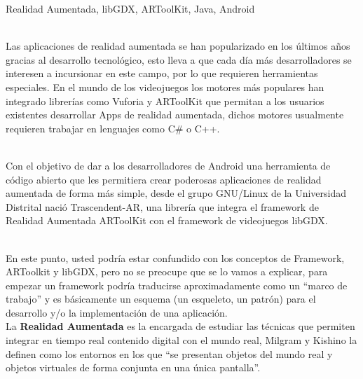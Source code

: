 \begin{multicols}{2}



 Realidad Aumentada, libGDX, ARToolKit, Java, Android



\\
Las aplicaciones de realidad aumentada se han popularizado en los últimos años gracias al desarrollo tecnológico, esto lleva a que cada día más desarrolladores se interesen a incursionar en este campo, por lo que requieren herramientas especiales. En el mundo de los videojuegos los motores más populares han integrado librerías como Vuforia y ARToolKit que permitan a los usuarios existentes desarrollar Apps de realidad aumentada, dichos motores usualmente requieren trabajar en lenguajes como C\# o C++. 

\\
Con el objetivo de dar a los desarrolladores de Android una herramienta de código abierto que les permitiera crear poderosas aplicaciones de realidad aumentada de forma más simple, desde el grupo GNU/Linux de la Universidad Distrital nació Trascendent-AR, una librería que integra el framework de Realidad Aumentada ARToolKit con el framework de videojuegos libGDX.

\\
En este punto, usted podría estar confundido con los conceptos de Framework, ARToolkit y libGDX, pero no se preocupe que se lo vamos a explicar, para empezar un framework podría traducirse aproximadamente como un “marco de trabajo” y es básicamente un esquema (un esqueleto, un patrón) para el desarrollo y/o la implementación de una aplicación.
\\

La \textbf {Realidad Aumentada} es la encargada de estudiar las técnicas que permiten integrar en tiempo real contenido digital con el mundo real, Milgram y Kishino la definen como los entornos en los que “se presentan objetos del mundo real y objetos virtuales de forma conjunta en una única pantalla”. \cite{libroRA}


\end{multicols}
